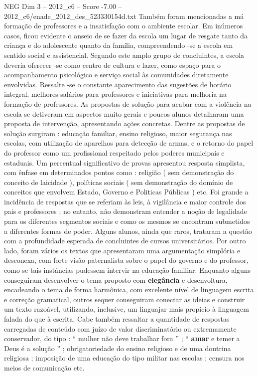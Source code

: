\begin{textsample}{NEG Dim 3 – 2012\_c6 – Score -7.00 – 2012\_c6/enade\_2012\_des\_523330154d.txt}
Também foram mencionadas a má formação de professores e a insatisfação com o ambiente escolar.
Em inúmeros casos, ficou evidente o anseio de se fazer da escola um lugar de resgate tanto da criança e do adolescente quanto da família, compreendendo -se a escola em sentido social e assistencial.
Segundo este amplo grupo de concluintes, a escola deveria oferecer -se como centro de cultura e lazer, como espaço para o acompanhamento psicológico e serviço social às comunidades diretamente envolvidas.
Ressalte -se o constante aparecimento das sugestões de horário integral, melhores salários para professores e iniciativas para melhoria na formação de professores.
As propostas de solução para acabar com a violência na escola se detiveram em aspectos muito gerais e poucos alunos detalharam uma proposta de intervenção, apresentando ações concretas.
Dentre as propostas de solução surgiram : educação familiar, ensino religioso, maior segurança nas escolas, com utilização de aparelhos para detecção de armas, e o retorno do papel do professor como um profissional respeitado pelos poderes municipais e estaduais.
Um percentual significativo de provas apresentou resposta simplista, com ênfase em determinados pontos como : religião ( sem demonstração do conceito de laicidade ), políticas sociais ( sem demonstração do domínio de conceitos que envolvem Estado, Governo e Politicas Públicas ) etc.
Foi grande a incidência de respostas que se referiam às leis, à vigilância e maior controle dos pais e professores ; no entanto, não demonstram entender a noção de legalidade para os diferentes segmentos sociais e como os mesmos se encontram submetidos a diferentes formas de poder.
Alguns alunos, ainda que raros, trataram a questão com a profundidade esperada de concluintes de cursos universitários.
Por outro lado, foram vários os textos que apresentaram uma argumentação simplória e desconexa, com forte visão paternalista sobre o papel do governo e do professor, como se tais instâncias pudessem intervir na educação familiar.
Enquanto alguns conseguiram desenvolver o tema proposto com \textbf{elegância} e desenvoltura, encadeando o tema de forma harmônica, com excelente nível de linguagem escrita e correção gramatical, outros sequer conseguiram conectar as ideias e construir um texto razoável, utilizando, inclusive, um linguajar mais propício à linguagem falada do que à escrita.
Cabe também ressaltar a quantidade de respostas carregadas de conteúdo com juízo de valor discriminatório ou extremamente conservador, do tipo : “ mulher não deve trabalhar fora ” ; “ \textbf{amar} e temer a Deus é a solução ” ; obrigatoriedade do ensino religioso e de uma doutrina religiosa ; imposição de uma educação do tipo militar nas escolas ; censura nos meios de comunicação etc.

\end{textsample}

